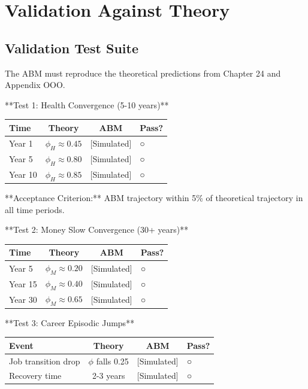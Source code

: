 \section{Validation Against Theory}
\label{ppp:validation}

\subsection{Validation Test Suite}

The ABM must reproduce the theoretical predictions from Chapter 24 and Appendix OOO.

**Test 1: Health Convergence (5-10 years)**

\begin{center}
\small
\begin{tabular}{@{}lcc@{}}
\toprule
\textbf{Time} & \textbf{Theory} & \textbf{ABM} & \textbf{Pass?} \\
\midrule
Year 1 & $\phi_H \approx 0.45$ & [Simulated] & ○ \\
Year 5 & $\phi_H \approx 0.80$ & [Simulated] & ○ \\
Year 10 & $\phi_H \approx 0.85$ & [Simulated] & ○ \\
\midrule
\end{tabular}
\end{center}

**Acceptance Criterion:** ABM trajectory within 5\% of theoretical trajectory in all time periods.

**Test 2: Money Slow Convergence (30+ years)**

\begin{center}
\small
\begin{tabular}{@{}lcc@{}}
\toprule
\textbf{Time} & \textbf{Theory} & \textbf{ABM} & \textbf{Pass?} \\
\midrule
Year 5 & $\phi_M \approx 0.20$ & [Simulated] & ○ \\
Year 15 & $\phi_M \approx 0.40$ & [Simulated] & ○ \\
Year 30 & $\phi_M \approx 0.65$ & [Simulated] & ○ \\
\midrule
\end{tabular}
\end{center}

**Test 3: Career Episodic Jumps**

\begin{center}
\small
\begin{tabular}{@{}lcc@{}}
\toprule
\textbf{Event} & \textbf{Theory} & \textbf{ABM} & \textbf{Pass?} \\
\midrule
Job transition drop & $\phi$ falls 0.25 & [Simulated] & ○ \\
Recovery time & 2-3 years & [Simulated] & ○ \\
\midrule
\end{tabular}
\end{center}

